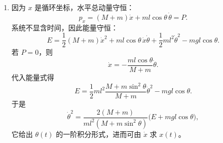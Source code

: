 \begin{question}[滑块--轻杆系统]
\begin{solution}
\begin{enumerate}
  \[
    \frac{\partial L}{\partial\theta}
    =-ml\sin\theta\,\dot x\dot\theta-mgl\sin\theta.
  \]
  代入后含 $\sin\theta\dot x\dot\theta$ 的项相消，得到
  \[
    ml\cos\theta\,\ddot x+ml^2\ddot\theta+mgl\sin\theta=0,
  \]
  或
  \[
    \boxed{l\ddot\theta+\cos\theta\,\ddot x+g\sin\theta=0.}
  \]
  两个方程联立给出完整运动。若初始时系统总水平动量为零，则可用动量积分消去 $x$，系统等价为一个具有 $\theta$ 依赖等效惯量的单自由度问题。

  \item 因为 $x$ 是循环坐标，水平总动量守恒：
  \[
    \boxed{p_x=(M+m)\dot x+ml\cos\theta\,\dot\theta=P.}
  \]
  系统不显含时间，因此能量守恒：
  \[
    \boxed{E=\frac12(M+m)\dot x^2
      +ml\cos\theta\,\dot x\dot\theta
      +\frac12ml^2\dot\theta^2-mgl\cos\theta.}
  \]
  若 $P=0$，则
  \[
    \dot x=-\frac{ml\cos\theta}{M+m}\dot\theta.
  \]
  代入能量式得
  \[
    E=\frac12ml^2\frac{M+m\sin^2\theta}{M+m}\dot\theta^2-mgl\cos\theta.
  \]
  于是
  \[
    \dot\theta^2
    =\frac{2(M+m)}{ml^2(M+m\sin^2\theta)}
      \bigl(E+mgl\cos\theta\bigr),
  \]
  它给出 $\theta(t)$ 的一阶积分形式，进而可由 $\dot x$ 求 $x(t)$。
\end{enumerate}
\end{solution}
\end{question}

